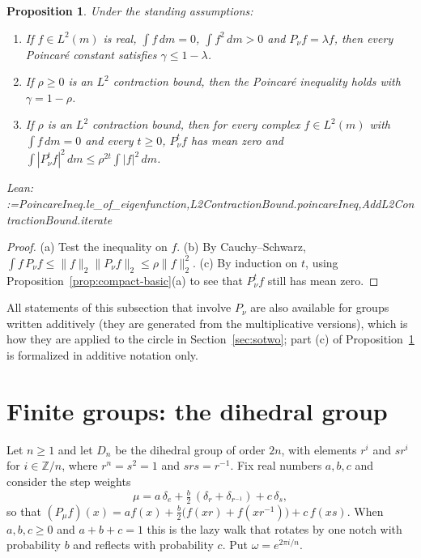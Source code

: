 \documentclass[11pt]{amsart}
\makeatletter
\newtheorem{proposition}[theorem]{Proposition}
\theoremstyle{definition}
\theoremstyle{remark}
\newcommand{\@leanlist}[1]{\def\@leansep{}\@for\@leanname:=#1\do{\@leansep
  \texttt{\expandafter\detokenize\expandafter{\@leanname}}\def\@leansep{, }}}
\newcommand{\lean}[1]{\par\smallskip\noindent
  {\footnotesize\normalfont\raggedright\textsf{Lean:} \@leanlist{#1}\par}}
\newcommand{\Z}{\mathbb{Z}}
\makeatother
\begin{document}
\begin{proposition}\label{prop:gap-tools}
Under the standing assumptions:
\begin{enumerate}
\item[(a)] If $f\in L^2(m)$ is real, $\int f\,dm=0$, $\int f^2\,dm>0$ and
$P_\nu f=\lambda f$, then every Poincar\'e constant satisfies $\gamma\le1-\lambda$.
\item[(b)] If $\rho\ge0$ is an $L^2$ contraction bound, then the Poincar\'e inequality holds
with $\gamma=1-\rho$.
\item[(c)] If $\rho$ is an $L^2$ contraction bound, then for every complex $f\in L^2(m)$ with
$\int f\,dm=0$ and every $t\ge0$, $P_\nu^tf$ has mean zero and
$\int|P_\nu^tf|^2\,dm\le\rho^{2t}\int|f|^2\,dm$.
\end{enumerate}
\lean{PoincareIneq.le_of_eigenfunction,L2ContractionBound.poincareIneq,AddL2ContractionBound.iterate}
\end{proposition}

\begin{proof}
(a) Test the inequality on $f$.  (b) By Cauchy--Schwarz,
$\int f\,P_\nu f\le\lVert f\rVert_2\lVert P_\nu f\rVert_2\le\rho\lVert f\rVert_2^2$.  (c) By
induction on $t$, using Proposition~\ref{prop:compact-basic}(a) to see that $P_\nu^tf$ still has
mean zero.
\end{proof}

All statements of this subsection that involve $P_\nu$ are also available for groups written
additively (they are generated from the multiplicative versions), which is how they are applied
to the circle in Section~\ref{sec:sotwo}; part (c) of Proposition~\ref{prop:gap-tools} is
formalized in additive notation only.

\section{Finite groups: the dihedral group}\label{sec:dihedral}

Let $n\ge1$ and let $D_n$ be the dihedral group of order $2n$, with elements $r^i$ and $sr^i$
for $i\in\Z/n$, where $r^n=s^2=1$ and $srs=r^{-1}$.  Fix real numbers $a,b,c$ and consider the
step weights
\[
  \mu=a\,\delta_e+\tfrac b2\,(\delta_r+\delta_{r^{-1}})+c\,\delta_s ,
\]
so that $(P_\mu f)(x)=a f(x)+\tfrac b2\bigl(f(xr)+f(xr^{-1})\bigr)+c\,f(xs)$.  When $a,b,c\ge0$
and $a+b+c=1$ this is the lazy walk that rotates by one notch with probability $b$ and reflects
with probability $c$.  Put $\omega=e^{2\pi i/n}$.
\end{document}
